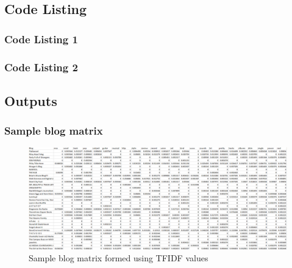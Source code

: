 \subsection{Code Listing}
\subsubsection{Code Listing 1}


\newpage

\subsubsection{Code Listing 2}


\newpage

\subsection{Outputs}
\subsubsection{Sample blog matrix}
\begin{figure}[ht]    
    \begin{center}
        \includegraphics[scale=0.4]{sampletfidfblog.png}
        \caption{Sample blog matrix formed using TFIDF values}
        \label{Sample5_t1}
    \end{center}
\end{figure}
\newpage
